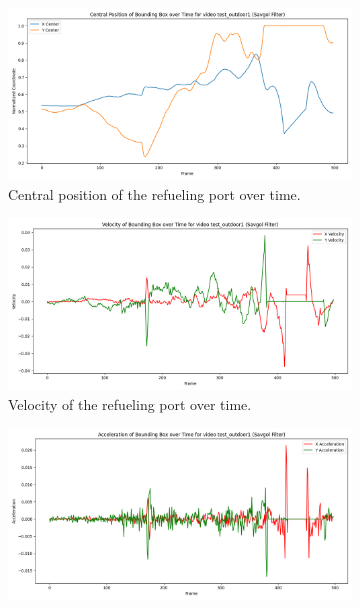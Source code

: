 \documentclass[12pt,oneside]{book} %
\begin{document}
\begin{figure}[H]
    \centering
    \begin{subfigure}[t]{0.6\textwidth}
        \includegraphics[width=\textwidth]{figures/bbox_metrics/test_outdoor1 (Savgol Filter)_central_position.png}
        \caption{Central position of the refueling port over time.}
        \label{fig:central-position-test-outdoor1-savgol}
    \end{subfigure}
    \hfill
    \begin{subfigure}[t]{0.6\textwidth}
        \includegraphics[width=\textwidth]{figures/bbox_metrics/test_outdoor1 (Savgol Filter)_velocity.png}
        \caption{Velocity of the refueling port over time.}
        \label{fig:velocity-test-outdoor1-savgol}
    \end{subfigure}
    \vfill
    \begin{subfigure}[t]{0.6\textwidth}
        \includegraphics[width=\textwidth]{figures/bbox_metrics/test_outdoor1 (Savgol Filter)_acceleration.png}

\end{subfigure}
\end{figure}
\end{document}
